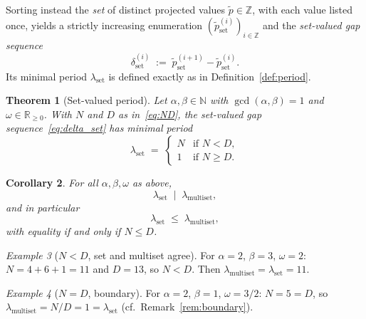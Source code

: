 \documentclass[11pt,reqno]{amsart}
\theoremstyle{plain}
\newtheorem{theorem}{Theorem}[section]
\newtheorem{corollary}[theorem]{Corollary}
\theoremstyle{definition}
\theoremstyle{remark}
\newtheorem{example}[theorem]{Example}
\begin{document}
Sorting instead the \emph{set} of distinct projected values
\(\tilde{p} \in \mathbb{Z}\), with each value listed once, yields a strictly
increasing enumeration \((\tilde{p}^{(i)}_{\mathrm{set}})_{i \in \mathbb{Z}}\)
and the \emph{set-valued gap sequence}
\begin{equation}\label{eq:delta_set}
    \delta^{(i)}_{\mathrm{set}}
    \;:=\; \tilde{p}^{(i+1)}_{\mathrm{set}} - \tilde{p}^{(i)}_{\mathrm{set}}.
\end{equation}
Its minimal period \(\lambda_{\mathrm{set}}\) is defined exactly as in
Definition~\ref{def:period}.

\begin{theorem}[Set-valued period]\label{thm:setperiod}
Let \(\alpha, \beta \in \mathbb{N}\) with \(\gcd(\alpha,\beta) = 1\) and
\(\omega \in \mathbb{R}_{\ge 0}\).  With \(N\) and \(D\) as
in~\eqref{eq:ND}, the set-valued gap sequence~\eqref{eq:delta_set}
has minimal period
\begin{equation}\label{eq:setformula}
    \lambda_{\mathrm{set}} \;=\;
    \begin{cases}
        N & \text{if } N < D, \\
        1 & \text{if } N \ge D.
    \end{cases}
\end{equation}
\end{theorem}

\begin{corollary}\label{cor:setlemultiset}
For all \(\alpha, \beta, \omega\) as above,
\[
    \lambda_{\mathrm{set}} \;\mid\; \lambda_{\mathrm{multiset}},
\]
and in particular
\[
    \lambda_{\mathrm{set}} \;\le\; \lambda_{\mathrm{multiset}},
\]
with equality if and only if \(N \le D\).
\end{corollary}

\begin{example}[\(N < D\), set and multiset agree]\label{ex:set_lt}
For \(\alpha = 2\), \(\beta = 3\), \(\omega = 2\): \(N = 4 + 6 + 1 = 11\)
and \(D = 13\), so \(N < D\).  Then
\(\lambda_{\mathrm{multiset}} = \lambda_{\mathrm{set}} = 11\).
\end{example}

\begin{example}[\(N = D\), boundary]\label{ex:set_eq}
For \(\alpha = 2\), \(\beta = 1\), \(\omega = 3/2\): \(N = 5 = D\), so
\(\lambda_{\mathrm{multiset}} = N/D = 1 = \lambda_{\mathrm{set}}\)
(cf.\ Remark~\ref{rem:boundary}).
\end{example}
\end{document}
